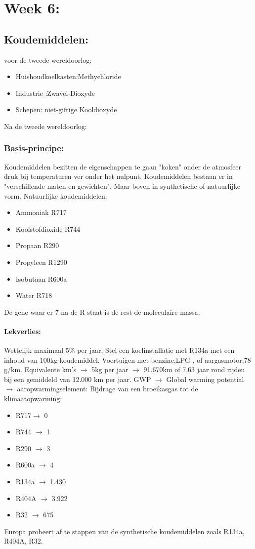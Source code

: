 \documentclass[12pt]{article}
\begin{document}
\section{Week 6:}
\subsection{Koudemiddelen:}
voor de tweede wereldoorlog:\begin{itemize}
    \item Huishoudkoelkasten:Methychloride
    \item Industrie :Zwavel-Dioxyde
    \item Schepen: niet-giftige Kooldioxyde
\end{itemize}
Na de tweede wereldoorlog:
\subsubsection{Basis-principe:}
Koudemiddelen bezitten de eigenschappen te gaan "koken" onder de atmosfeer druk bij temperaturen ver onder het nulpunt. Koudemiddelen bestaan er in "verschillende maten en gewichten". Maar boven in synthetische of natuurlijke vorm. Natuurlijke koudemiddelen:\begin{itemize}
    \item Ammoniak R717 
    \item Koolstofdioxide R744 
    \item Propaan R290 
    \item Propyleen R1290 
    \item Isobutaan R600a 
    \item Water R718
\end{itemize}
De gene waar er 7 na de R staat is de rest de moleculaire massa.
\paragraph{Lekverlies:}
Wettelijk maximaal 5\% per jaar. Stel een koelinstallatie met R134a met een inhoud van 100kg koudemiddel. Voertuigen met benzine,LPG-, of aargasmotor:78 g/km. Equivalente km's $\rightarrow$ 5kg per jaar $\rightarrow$ 91.670km of 7,63 jaar rond rijden bij een gemiddeld van 12.000 km per jaar.\newline
GWP $\rightarrow$ Global warming potential $\rightarrow$ aaropwarmingselement: Bijdrage van een broeikasgas tot de klimaatopwarming:\begin{itemize}
    \item R717$\rightarrow$ 0
    \item R744 $\rightarrow$ 1 
    \item R290 $\rightarrow$ 3
    \item R600a $\rightarrow$ 4 
    \item R134a $\rightarrow$ 1.430 
    \item R404A $\rightarrow$ 3.922 
    \item R32 $\rightarrow$ 675
\end{itemize}
Europa probeert af te stappen van de synthetische koudemiddelen zoals R134a, R404A, R32.
\end{document}
